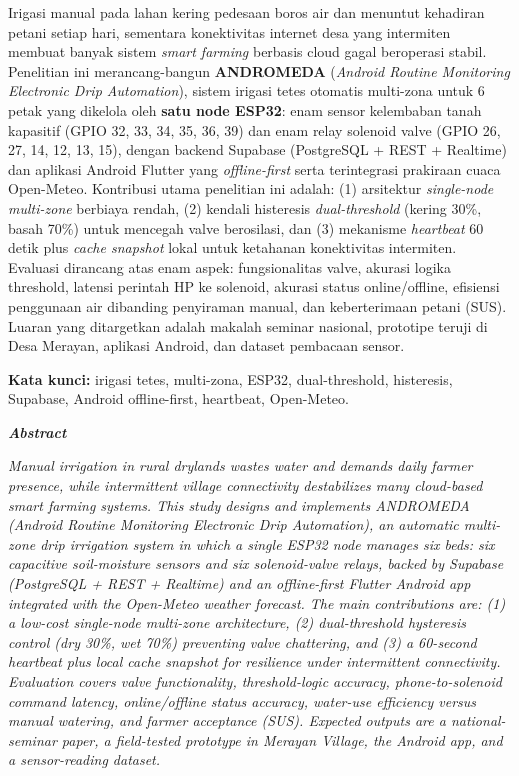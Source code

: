 \documentclass[12pt,a4paper,oneside]{report}
\begin{document}
Irigasi manual pada lahan kering pedesaan boros air dan menuntut kehadiran petani setiap hari, sementara konektivitas internet desa yang intermiten membuat banyak sistem \textit{smart farming} berbasis cloud gagal beroperasi stabil. Penelitian ini merancang-bangun \textbf{ANDROMEDA} (\textit{Android Routine Monitoring Electronic Drip Automation}), sistem irigasi tetes otomatis multi-zona untuk 6 petak yang dikelola oleh \textbf{satu node ESP32}: enam sensor kelembaban tanah kapasitif (GPIO 32, 33, 34, 35, 36, 39) dan enam relay solenoid valve (GPIO 26, 27, 14, 12, 13, 15), dengan backend Supabase (PostgreSQL + REST + Realtime) dan aplikasi Android Flutter yang \textit{offline-first} serta terintegrasi prakiraan cuaca Open-Meteo. Kontribusi utama penelitian ini adalah: (1) arsitektur \textit{single-node multi-zone} berbiaya rendah, (2) kendali histeresis \textit{dual-threshold} (kering 30\%, basah 70\%) untuk mencegah valve berosilasi, dan (3) mekanisme \textit{heartbeat} 60 detik plus \textit{cache snapshot} lokal untuk ketahanan konektivitas intermiten. Evaluasi dirancang atas enam aspek: fungsionalitas valve, akurasi logika threshold, latensi perintah HP ke solenoid, akurasi status online/offline, efisiensi penggunaan air dibanding penyiraman manual, dan keberterimaan petani (SUS). Luaran yang ditargetkan adalah makalah seminar nasional, prototipe teruji di Desa Merayan, aplikasi Android, dan dataset pembacaan sensor.

\textbf{Kata kunci:} irigasi tetes, multi-zona, ESP32, dual-threshold, histeresis, Supabase, Android offline-first, heartbeat, Open-Meteo.

\vspace{0.6cm}
\begin{center}\textbf{\textit{Abstract}}\end{center}
\textit{Manual irrigation in rural drylands wastes water and demands daily farmer presence, while intermittent village connectivity destabilizes many cloud-based smart farming systems. This study designs and implements ANDROMEDA (Android Routine Monitoring Electronic Drip Automation), an automatic multi-zone drip irrigation system in which a single ESP32 node manages six beds: six capacitive soil-moisture sensors and six solenoid-valve relays, backed by Supabase (PostgreSQL + REST + Realtime) and an offline-first Flutter Android app integrated with the Open-Meteo weather forecast. The main contributions are: (1) a low-cost single-node multi-zone architecture, (2) dual-threshold hysteresis control (dry 30\%, wet 70\%) preventing valve chattering, and (3) a 60-second heartbeat plus local cache snapshot for resilience under intermittent connectivity. Evaluation covers valve functionality, threshold-logic accuracy, phone-to-solenoid command latency, online/offline status accuracy, water-use efficiency versus manual watering, and farmer acceptance (SUS). Expected outputs are a national-seminar paper, a field-tested prototype in Merayan Village, the Android app, and a sensor-reading dataset.}
\end{document}

